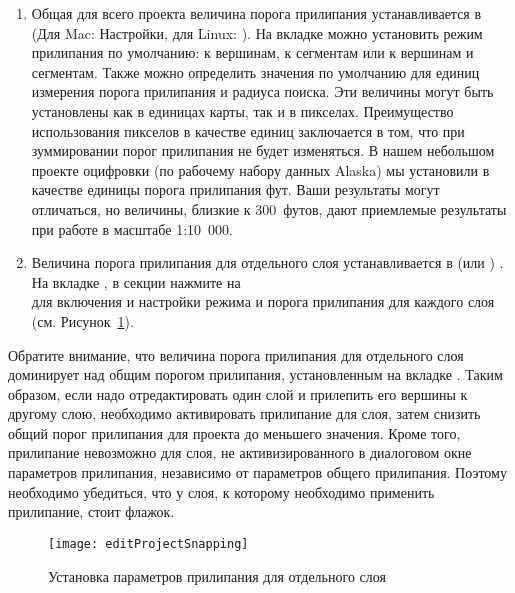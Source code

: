 \begin{enumerate}
\item Общая для всего проекта величина порога прилипания устанавливается в
 \arrow {}
(Для Mac: \mainmenuopt{\qg} \arrow Настройки, для Linux: 
\arrow {}).
На вкладке  можно установить режим прилипания по умолчанию:
к вершинам, к сегментам или к вершинам и сегментам. Также можно определить
значения по умолчанию для единиц измерения порога прилипания и радиуса поиска.
Эти величины  могут быть установлены как в единицах карты, так и в пикселах.
Преимущество использования пикселов в качестве единиц заключается в том, что
при зуммировании порог прилипания не будет изменяться.
В нашем небольшом проекте оцифровки (по рабочему набору данных Alaska) мы
установили в качестве единицы порога прилипания фут. Ваши результаты могут
отличаться, но величины, близкие к 300~футов, дают приемлемые
результаты при работе в масштабе 1:10~000.
\item Величина порога прилипания для отдельного слоя устанавливается в
 (или ) \arrow
{}. На вкладке ,
в секции  нажмите на \\
 для
включения и настройки режима и порога прилипания для каждого слоя (см.
Рисунок~\ref{fig:snappingoptions}).
\end{enumerate}
Обратите внимание, что величина порога прилипания для отдельного слоя
доминирует над общим порогом прилипания, установленным на вкладке .
Таким образом, если надо отредактировать один слой и прилепить его вершины
к другому слою, необходимо активировать прилипание 
для слоя, затем снизить общий порог прилипания для проекта до меньшего
значения. Кроме того, прилипание невозможно для слоя, не активизированного
в диалоговом окне параметров прилипания, независимо от параметров
общего прилипания. Поэтому необходимо убедиться, что у слоя, к которому
необходимо применить прилипание, стоит флажок.

\begin{figure}[ht]
   \centering
   \texttt{[image: editProjectSnapping]}
   \caption{Установка параметров прилипания для отдельного слоя \wincaption}\label{fig:snappingoptions}
\end{figure}

